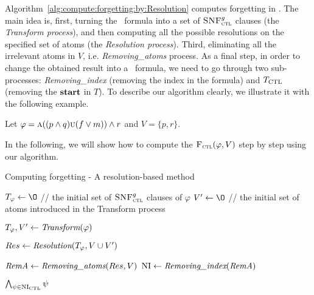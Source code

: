 \documentclass[letterpaper]{article} %
\begin{document}
Algorithm~\ref{alg:compute:forgetting:by:Resolution} computes forgetting in \CTL.
The main idea is, first, turning the \CTL\ formula into a set of ${\textsc{SNF}_{\textsc{ctl}}^g}$ clauses (the \emph{Transform process}), and then computing all the possible resolutions on the specified set of atoms (the \emph{Resolution process}). Third, eliminating all the irrelevant atoms in $V$, i.e. \emph{Removing\_atoms} process. %
As a final step, in order to change the obtained result into a \CTL\ formula, we need to go through two sub-processes: \emph{Removing\_index} (removing the index in the formula) and $T_{\textrm{CTL}}$ (removing the $\textbf{start}$ in $T$).
To describe our algorithm clearly, we illustrate it with the following example.
\begin{example}\label{main:examp}
Let $\varphi=\textsc{a}((p\wedge q) \textsc{u} (f\vee m)) \wedge r$ and $V=\{p,r\}$.
\end{example}
In the following, we will show how to compute the ${\textsc{F}_{\textsc{ctl}}}(\varphi, V)$ step by step using our algorithm.


\begin{algorithm}[!h]
\caption{Computing forgetting - A resolution-based method}%
\label{alg:compute:forgetting:by:Resolution}
$T_{\varphi}\lto {\O}$ // the initial set of ${\textsc{SNF}_{\textsc{ctl}}^g}$ clauses of $\varphi$ \;
$V'\lto {\O}$ // the initial set of atoms introduced in the Transform process\;


$T_{\varphi}, V' \leftarrow \emph{Transform}(\varphi)$\;

$Res \leftarrow \emph{Resolution}(T_{\varphi}, V\cup V')$ \;

$\emph{RemA} \leftarrow \emph{Removing\_atoms}(Res, V)$ \;
$\textrm{NI} \leftarrow \emph{Removing\_index}(\emph{RemA})$ \; %


\Return $\bigwedge_{\psi \in \textrm{NI}_{\textrm{CTL}}} \psi$\;
\end{algorithm}

\end{document}
